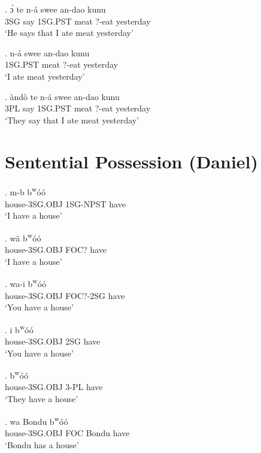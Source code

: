 \documentclass{assets/fieldnotes}
\begin{document}
\exg.  ɔ́ te n-á swee an-dao kunu\\
3SG say 1SG.PST meat ?-eat yesterday\\
    `He says that I ate meat yesterday'

\exg.  n-á swee an-dao kunu\\
1SG.PST meat ?-eat yesterday\\
    `I ate meat yesterday'


\exg.  àndò te n-á swee an-dao kunu\\
3PL say 1SG.PST meat ?-eat yesterday\\
    `They say that I ate meat yesterday'



\section{Sentential Possession (Daniel)}

\exg.  m-b b\textsuperscript{w}óó\\
house-3SG.OBJ 1SG-NPST have\\
`I have a house' 

\exg.  wã b\textsuperscript{w}óó\\
house-3SG.OBJ FOC? have\\
`I have a house' \label{2sgex}

\ex.  wa-i b\textsuperscript{w}óó\\
house-3SG.OBJ FOC?-2SG have\\
`You have a house'

\exg.  i b\textsuperscript{w}óó\\
house-3SG.OBJ 2SG have\\
`You have a house'

\exg.   b\textsuperscript{w}óó\\
house-3SG.OBJ 3-PL have\\
`They have a house' 

\exg.  wa Bondu b\textsuperscript{w}óó\\
house-3SG.OBJ FOC Bondu have\\
`Bondu has a house'
\end{document}
